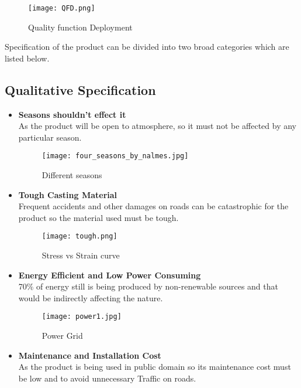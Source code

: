\documentclass[12pt]{article}
\begin{document}
\begin{figure}[!htb]
\centering
\texttt{[image: QFD.png]}
\caption{\label{fig:}Quality function Deployment}
\end{figure}

\newpage

Specification of the product can be divided into two broad categories which are listed below.

\subsection{Qualitative Specification}

\begin{itemize}
\item \textbf{Seasons shouldn’t effect it} \\
As the product will be open to atmosphere, so it must not be affected by any particular season. 

\begin{figure}[!htb]
\centering
\texttt{[image: four\_seasons\_by\_nalmes.jpg]}
\caption{\label{fig:}Different seasons}
\end{figure}

\item \textbf{Tough Casting Material} \\
Frequent accidents and other damages on roads can be catastrophic for the product so the material used must be tough.

\begin{figure}[!htb]
\centering
\texttt{[image: tough.png]}
\caption{\label{fig:}Stress vs Strain curve}
\end{figure}

\item \textbf{Energy Efficient and Low Power Consuming} \\
70\% of energy still is being produced by non-renewable sources and that would be indirectly affecting the nature.

\begin{figure}[!htb]
\centering
\texttt{[image: power1.jpg]}
\caption{\label{fig:}Power Grid}
\end{figure}

\newpage

\item \textbf{Maintenance and Installation Cost} \\
As the product is being used in public domain so its maintenance cost must be low and to avoid unnecessary Traffic on roads.


\end{itemize}
\end{document}
